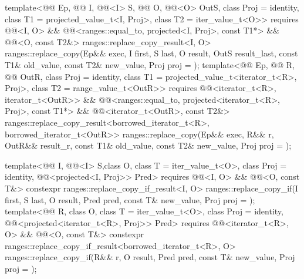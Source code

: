 \begin{itemdecl}
template<@@ Ep, @@ I, @@<I> S,
         @@ O, @@<O> OutS,
         class Proj = identity,
         class T1 = projected_value_t<I, Proj>, class T2 = iter_value_t<O>>
  requires @@<I, O> &&
           @@<ranges::equal_to, projected<I, Proj>, const T1*> &&
           @@<O, const T2&>
  ranges::replace_copy_result<I, O>
    ranges::replace_copy(Ep&& exec, I first, S last, O result, OutS result_last,
                         const T1& old_value, const T2& new_value, Proj proj = {});
template<@@ Ep, @@ R, @@ OutR,
         class Proj = identity, class T1 = projected_value_t<iterator_t<R>, Proj>,
         class T2 = range_value_t<OutR>>
  requires @@<iterator_t<R>, iterator_t<OutR>> &&
           @@<ranges::equal_to,
                                      projected<iterator_t<R>, Proj>, const T1*> &&
           @@<iterator_t<OutR>, const T2&>
  ranges::replace_copy_result<borrowed_iterator_t<R>, borrowed_iterator_t<OutR>>
    ranges::replace_copy(Ep&& exec, R&& r, OutR&& result_r, const T1& old_value,
                         const T2& new_value, Proj proj = {});

template<@@ I, @@<I> S,class O, class T = iter_value_t<O>,
         class Proj = identity, @@<projected<I, Proj>> Pred>
  requires @@<I, O> && @@<O, const T&>
  constexpr ranges::replace_copy_if_result<I, O>
    ranges::replace_copy_if(I first, S last, O result, Pred pred, const T& new_value,
                            Proj proj = {});
template<@@ R, class O, class T = iter_value_t<O>, class Proj = identity,
         @@<projected<iterator_t<R>, Proj>> Pred>
  requires @@<iterator_t<R>, O> && @@<O, const T&>
  constexpr ranges::replace_copy_if_result<borrowed_iterator_t<R>, O>
    ranges::replace_copy_if(R&& r, O result, Pred pred, const T& new_value,
                            Proj proj = {});


\end{itemdecl}
